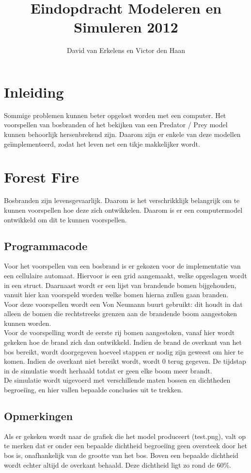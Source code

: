 \documentclass[11pt,a4paper,oneside,noindent]{article}
\begin{document}
 \title{Eindopdracht Modeleren en Simuleren 2012}
 \author{David van Erkelens en Victor den Haan}
\setlength{\parindent}{0pt}
 \maketitle
\section{Inleiding}
Sommige problemen kunnen beter opgelost worden met een computer. Het voorspellen van bosbranden of het bekijken van een Predator / Prey model kunnen behoorlijk hersenbrekend zijn. Daarom zijn er enkele van deze modellen ge\"implementeerd, zodat het leven net een tikje makkelijker wordt.

 \section{Forest Fire}
Bosbranden zijn levensgevaarlijk. Daarom is het verschrikklijk belangrijk om te kunnen voorspellen hoe deze zich ontwikkelen. Daarom is er een computermodel ontwikkeld om dit te kunnen voorspellen.

\subsection{Programmacode}
Voor het voorspellen van een bosbrand is er gekozen voor de implementatie van een cellulaire automaat. Hiervoor is een grid aangemaakt, welke opgeslagen wordt in een struct. Daarnaast wordt er een lijst van brandende bomen bijgehouden, vanuit hier kan voorspeld worden welke bomen hierna zullen gaan branden. \\
Voor deze voorspellen wordt een Von Neumann buurt gebruikt: dit houdt in dat alleen de bomen die rechtstreeks grenzen aan de brandende boom aangestoken kunnen worden. \\
Voor de voorspelling wordt de eerste rij bomen aangestoken, vanaf hier wordt gekeken hoe de brand zich dan ontwikkeld. Indien de brand de overkant van het bos bereikt, wordt doorgegeven hoeveel stappen er nodig zijn geweest om hier te komen. Indien de overkant niet bereikt wordt, wordt 0 terug gegeven. De tijdstap in de simulatie wordt herhaald totdat er geen elke boom meer brandt. \\
De simulatie wordt uigevoerd met verschillende maten bossen en dichtheden begroei\"ing, en hier vallen bepaalde conclusies uit te trekken.

\subsection{Opmerkingen}
Als er gekeken wordt naar de grafiek die het model produceert (test.png), valt op te merken dat er onder een bepaalde dichtheid begroei\"ing geen oversteek door het bos is, onafhankelijk van de grootte van het bos. Boven een bepaalde dichtheid wordt echter altijd de overkant behaald. Deze dichtheid ligt zo rond de 60\%.
\end{document}
